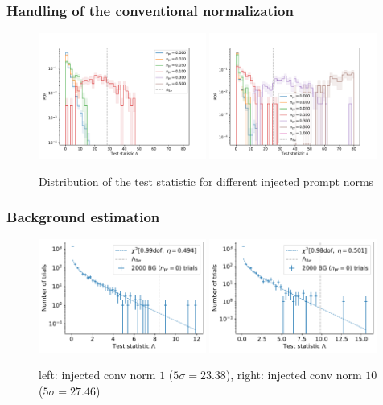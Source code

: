 \documentclass[aspectratio=1610, 9pt]{beamer}
\begin{document}
\begin{frame}
  \frametitle{Handling of the conventional normalization}
  \begin{figure}
    \centering
    \includegraphics[width=0.49\textwidth]{../Plots/TS_distribution_fit_conv=1_1y_null_fixed}
    \includegraphics[width=0.49\textwidth]{../Plots/TS_distribution_fit_conv=1_1y}
    \caption{Distribution of the test statistic for different injected prompt norms}
  \end{figure}
\end{frame}
\begin{frame}
  \frametitle{Background estimation}
  \begin{figure}
    \centering
    \includegraphics[width=0.49\textwidth]{../Plots/background_distribution_fit_conv=1.pdf}
    \includegraphics[width=0.49\textwidth]{../Plots/background_distribution_fit_conv=10.pdf}
    \caption{left: injected conv norm $1$ ($5\sigma=23.38$), right: injected conv norm $10$ ($5\sigma=27.46$)}
  \end{figure}
\end{frame}
\end{document}
